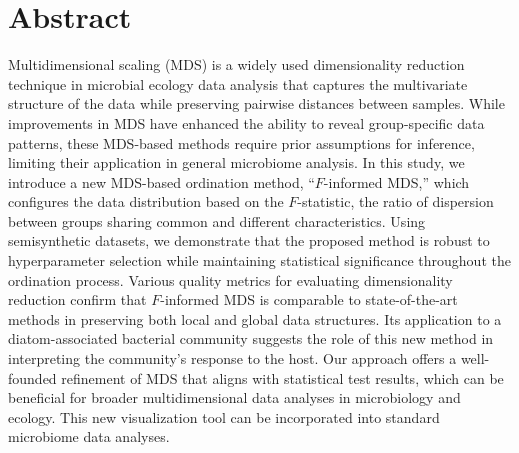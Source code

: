 \documentclass[10pt,letterpaper]{article}
\newcommand{\1}{{\rm 1}\kern-0.24em{\rm I}}
\begin{document}
\section*{Abstract}
Multidimensional scaling (MDS) is a widely used dimensionality reduction technique in microbial ecology data analysis that captures the multivariate structure of the data while preserving pairwise distances between samples. While improvements in MDS have enhanced the ability to reveal group-specific data patterns, these MDS-based methods require prior assumptions for inference, limiting their application in general microbiome analysis.
In this study, we introduce a new MDS-based ordination method, ``$F$-informed MDS,'' which configures the data distribution based on the $F$-statistic, the ratio of dispersion between groups sharing common and different characteristics. Using semisynthetic datasets, we demonstrate that the proposed method is robust to hyperparameter selection while maintaining statistical significance throughout the ordination process.
Various quality metrics for evaluating dimensionality reduction confirm that $F$-informed MDS is comparable to state-of-the-art methods in preserving both local and global data structures. Its application to a diatom-associated bacterial community suggests the role of this new method in interpreting the community’s response to the host.
Our approach offers a well-founded refinement of MDS that aligns with statistical test results, which can be beneficial for broader multidimensional data analyses in microbiology and ecology. This new visualization tool can be incorporated into standard microbiome data analyses.
\end{document}
